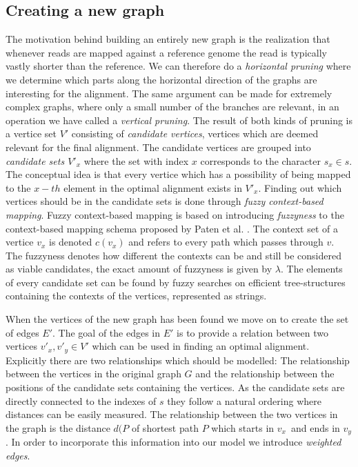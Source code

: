 \documentclass[thesis.tex]{subfiles}
\begin{document}
\subsection{Creating a new graph}
The motivation behind building an entirely new graph is the realization that whenever reads are mapped against a reference genome the read is typically vastly shorter than the reference. We can therefore do a \textit{horizontal pruning} where we determine which parts along the horizontal direction of the graphs are interesting for the alignment. The same argument can be made for extremely complex graphs, where only a small number of the branches are relevant, in an operation we have called a \textit{vertical pruning}. The result of both kinds of pruning is a vertice set $V'$ consisting of \textit{candidate vertices}, vertices which are deemed relevant for the final alignment. The candidate vertices are grouped into \textit{candidate sets $V'_x$} where the set with index $x$ corresponds to the character $s_x \in s$. The conceptual idea is that every vertice which has a possibility of being mapped to the $x-th$ element in the optimal alignment exists in $V'_x$. Finding out which vertices should be in the candidate sets is done through \textit{fuzzy context-based mapping}. Fuzzy context-based mapping is based on introducing \textit{fuzzyness} to the context-based mapping schema proposed by Paten et al. \cite{mapping_to_a_reference_genome_structure}. The context set of a vertice $v_x$ is denoted $c(v_x)$ and refers to every path which passes through $v$. The fuzzyness denotes how different the contexts can be and still be considered as viable candidates, the exact amount of fuzzyness is given by $\lambda$. The elements of every candidate set can be found by fuzzy searches on efficient tree-structures containing the contexts of the vertices, represented as strings.\\
\par\noindent
When the vertices of the new graph has been found we move on to create the set of edges $E'$. The goal of the edges in $E'$ is to provide a relation between two vertices $v'_x, v'_y \in V'$ which can be used in finding an optimal alignment. Explicitly there are two relationships which should be modelled: The relationship between the vertices in the original graph $G$ and the relationship between the positions of the candidate sets containing the vertices. As the candidate sets are directly connected to the indexes of $s$ they follow a natural ordering where distances can be easily measured. The relationship between the two vertices in the graph is the distance $d(P$ of shortest path $P$ which starts in $v_x$ and ends in $v_y$. In order to incorporate this information into our model we introduce \textit{weighted edges}.
\end{document}
